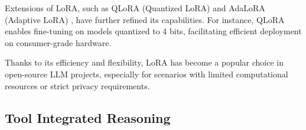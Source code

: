 Extensions of LoRA, such as QLoRA (Quantized LoRA) \citep{Dettmers2023QLoRA} and AdaLoRA (Adaptive LoRA) \citep{Zhang2023AdaLora}, have further refined its capabilities. For instance, QLoRA enables fine-tuning on models quantized to 4 bits, facilitating efficient deployment on consumer-grade hardware.  %

Thanks to its efficiency and flexibility, LoRA has become a popular choice in open-source LLM projects, especially for scenarios with limited computational resources or strict privacy requirements.



\subsection{Tool Integrated Reasoning}




